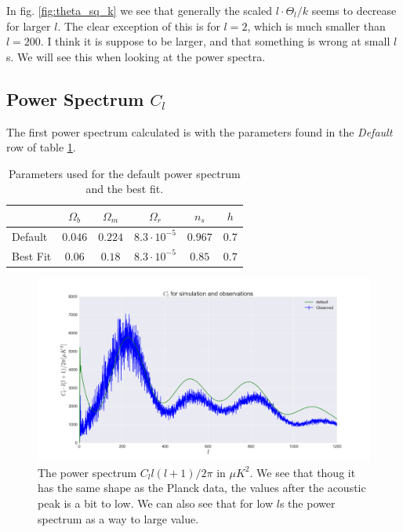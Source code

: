 \documentclass[a4paper,norsk, 10pt]{article}
\begin{document}
In fig. \ref{fig:theta_sq_k} we see that generally the scaled $l\cdot \Theta_l/k$ seems to decrease for larger $l$. The clear exception of this is for $l=2$, which is much smaller than $l=200$. I think it is suppose to be larger, and that something is wrong at small $l$s. We will see this when looking at the power spectra.

\subsection{Power Spectrum $C_l$}
The first power spectrum calculated is with the parameters found in the \textit{Default} row of table \ref{tab:parameters}. 

\begin{table}[!htb]
\centering
\begin{tabular}{l c c c c c}
& $\Omega_b$ & $\Omega_m$ & $\Omega_r$ & $n_s$ & $h$ \\
\hline 
Default & $0.046$ & $0.224$ & $8.3\cdot 10^{-5}$ & $0.967$ & $0.7$ \\
Best Fit & $0.06$ & $0.18$ & $8.3\cdot 10^{-5}$ & $0.85$ & $0.7$ \\

\end{tabular}
\caption{Parameters used for the default power spectrum and the best fit.}\label{tab:parameters}
\end{table}

\begin{figure}[!htp]
\centering
\includegraphics[scale=0.25]{Cl.png}
\caption{The power spectrum $C_l l(l+1)/2\pi$ in $\mu K^2$. We see that thoug it has the same shape as the Planck data, the values after the acoustic peak is a bit to low. We can also see that for low $l$s the power spectrum as a way to large value.}\label{fig:Cl_default}
\end{figure}
\end{document}
